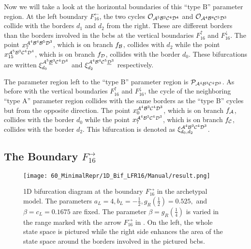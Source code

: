 Now we will take a look at the horizontal boundaries of this ``type B'' parameter region.
At the left boundary $F_{16}^\leftarrow$, the two cycles $\mathcal{O}_{\mathcal{A}^5\mathcal{B}^3\mathcal{C}^4\mathcal{D}^4}$ and $\mathcal{O}_{\mathcal{A}^4\mathcal{B}^4\mathcal{C}^5\mathcal{D}^3}$ collide with the borders $d_1$ and $d_2$ from the right.
These are different borders than the borders involved in the \glspl{bcb} at the vertical boundaries $F_{16}^\uparrow$ and $F_{16}^\downarrow$.
The point $x_{7}^{\mathcal{A}^4\mathcal{B}^4\mathcal{B}^5\mathcal{D}^3}$, which is on branch $f_{\mathcal{B}}$, collides with $d_2$ while the point $x_{15}^{\mathcal{A}^5\mathcal{B}^3\mathcal{C}^4\mathcal{D}^4}$, which is on branch $f_{\mathcal{D}}$, collides with the border $d_0$.
These bifurcations are written $\xi_{d_0}^{\mathcal{A}^5\underline{\mathcal{B}}^3\mathcal{C}^4\mathcal{D}^4}$ and $\xi_{d_2}^{\mathcal{A}^4\mathcal{B}^4\mathcal{C}^5\underline{\mathcal{D}}^3}$ respectively.

The parameter region left to the ``type B'' parameter region is $\mathcal{P}_{\mathcal{A}^4\mathcal{B}^3\mathcal{C}^4\mathcal{D}^3}$.
As before with the vertical boundaries $F_{16}^\uparrow$ and $F_{16}^\downarrow$, the cycle of the neighboring ``type A'' parameter region collides with the same borders as the ``type B'' cycles but from the opposite direction.
The point $x_{0}^{\mathcal{A}^4\mathcal{B}^3\mathcal{C}^4\mathcal{D}^3}$, which is on branch $f_{\mathcal{A}}$, collides with the border $d_0$ while the point $x_{7}^{\mathcal{A}^4\mathcal{B}^3\mathcal{C}^4\mathcal{D}^3}$, which is on branch $f_{\mathcal{C}}$, collides with the border $d_2$.
This bifurcation is denoted as $\xi_{d_0, d_2}^{\mathcal{A}^4\mathcal{B}^3\mathcal{C}^4\mathcal{D}^3}$.

\subsection{The Boundary $F_{16}^\rightarrow$}
\label{sec:arch.bif.R}

\begin{figure}
	\centering
	\texttt{[image: 60\_MinimalRepr/1D\_Bif\_LFR16/Manual/result.png]}
	\label{fig:arch.bif.F.right}
	\caption[1D bifurcation diagram at the boundary $F_{16}^\rightarrow$ in the archetypal model]{
		1D bifurcation diagram at the boundary $F_{16}^\rightarrow$ in the archetypal model.
		The parameters $a_L = 4, b_L = -\frac{1}{2}, g_R\left(\frac{1}{2}\right) = 0.525,$ and $\beta = c_L = 0.1675$ are fixed.
		The parameter $\beta = g_R\left(\frac{1}{4}\right)$ is varied in the range marked with the arrow $F_{16}^\rightarrow$ in .
		On the left, the whole state space is pictured while the right side enhances the area of the state space around the borders involved in the pictured \glspl{bcb}.
	}
\end{figure}

